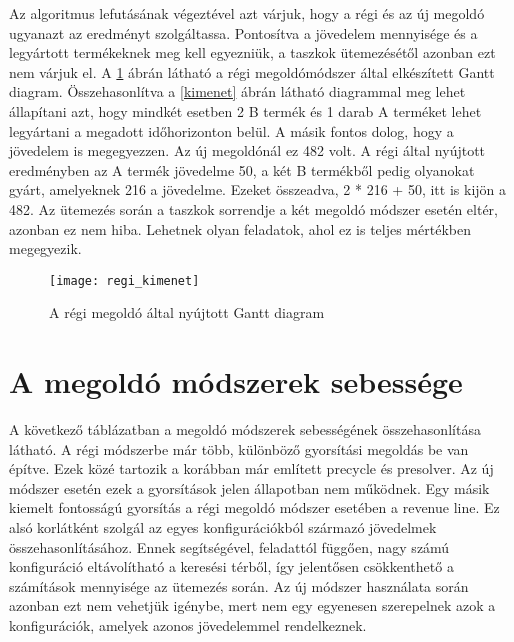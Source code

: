 Az algoritmus lefutásának végeztével azt várjuk, hogy a régi és az új megoldó ugyanazt az eredményt szolgáltassa. Pontosítva a jövedelem mennyisége és a legyártott termékeknek meg kell egyezniük, a taszkok ütemezésétől azonban ezt nem várjuk el. A \ref{regi_kimenet} ábrán látható a régi megoldómódszer által elkészített Gantt diagram. Összehasonlítva a \ref{kimenet} ábrán látható diagrammal meg lehet állapítani azt, hogy mindkét esetben 2 B termék és 1 darab A terméket lehet legyártani a megadott időhorizonton belül. A másik fontos dolog, hogy a jövedelem is megegyezzen. Az új megoldónál ez 482 volt. A régi által nyújtott eredményben az A termék jövedelme 50, a két B termékből pedig olyanokat gyárt, amelyeknek 216 a jövedelme. Ezeket összeadva, 2 * 216 + 50, itt is kijön a 482. Az ütemezés során a taszkok sorrendje a két megoldó módszer esetén eltér, azonban ez nem hiba. Lehetnek olyan feladatok, ahol ez is teljes mértékben megegyezik.
\begin{figure}[H]
\begin{center}
\texttt{[image: regi\_kimenet]}
\caption{A régi megoldó által nyújtott Gantt diagram}
\label{regi_kimenet}
\end{center}
\end{figure}

\section{A megoldó módszerek sebessége}
A következő táblázatban a megoldó módszerek sebességének összehasonlítása látható. A régi módszerbe már több, különböző gyorsítási megoldás be van építve. Ezek közé tartozik a korábban már említett precycle és presolver. Az új módszer esetén ezek a gyorsítások jelen állapotban nem működnek. Egy másik kiemelt fontosságú gyorsítás a régi megoldó módszer esetében a revenue line. Ez alsó korlátként szolgál az egyes konfigurációkból származó jövedelmek összehasonlításához. Ennek segítségével, feladattól függően, nagy számú konfiguráció eltávolítható a keresési térből, így jelentősen csökkenthető a számítások mennyisége az ütemezés során. Az új módszer használata során azonban ezt nem vehetjük igénybe, mert nem egy egyenesen szerepelnek azok a konfigurációk, amelyek azonos jövedelemmel rendelkeznek. 

